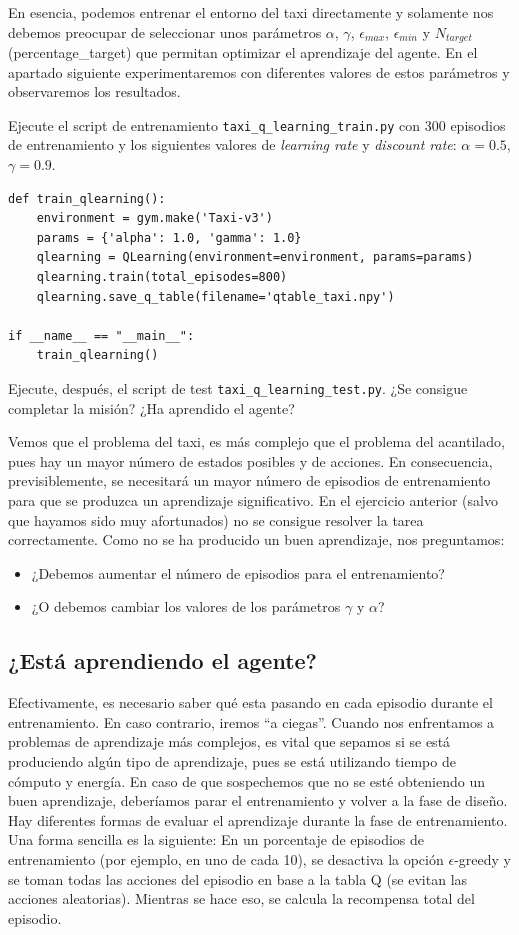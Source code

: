 \documentclass{article}
\begin{document}
En esencia, podemos entrenar el entorno del taxi directamente y solamente nos debemos preocupar de seleccionar unos parámetros $\alpha$, $\gamma$, $\epsilon_{max}$, $\epsilon_{min}$ y $N_{target}$ (percentage\_target) que permitan optimizar el aprendizaje del agente. En el apartado siguiente experimentaremos con diferentes valores de estos parámetros y observaremos los resultados.

\begin{exercise}
    Ejecute el script de entrenamiento \texttt{taxi\_q\_learning\_train.py} con 300 episodios de entrenamiento y los siguientes valores de \textit{learning rate} y \textit{discount rate}: $\alpha=0.5$, $\gamma=0.9$. 
\begin{verbatim}
def train_qlearning():
    environment = gym.make('Taxi-v3')
    params = {'alpha': 1.0, 'gamma': 1.0}
    qlearning = QLearning(environment=environment, params=params)
    qlearning.train(total_episodes=800)
    qlearning.save_q_table(filename='qtable_taxi.npy')
    
if __name__ == "__main__":
    train_qlearning()    
\end{verbatim}
Ejecute, después, el script de test \texttt{taxi\_q\_learning\_test.py}. ¿Se consigue completar la misión? ¿Ha aprendido el agente?
\end{exercise}

Vemos que el problema del taxi, es más complejo que el problema del acantilado, pues hay un mayor número de estados posibles y de acciones. En consecuencia, previsiblemente, se necesitará un mayor número de episodios de entrenamiento para que se produzca un aprendizaje significativo. En el ejercicio anterior (salvo que hayamos sido muy afortunados) no se consigue resolver la tarea correctamente. Como no se ha producido un buen aprendizaje, nos preguntamos:
\begin{itemize}
    \item ¿Debemos aumentar el número de episodios para el entrenamiento?
    \item ¿O debemos cambiar los valores de los parámetros $\gamma$ y $\alpha$?    
\end{itemize}

\subsection{¿Está aprendiendo el agente?}
 Efectivamente, es necesario saber qué esta pasando en cada episodio durante el entrenamiento. En caso contrario, iremos ``a ciegas''. Cuando nos enfrentamos a problemas de aprendizaje más complejos, es vital que sepamos si se está produciendo algún tipo de aprendizaje, pues se está utilizando tiempo de cómputo y energía. En caso de que sospechemos que no se esté obteniendo un buen aprendizaje, deberíamos parar el entrenamiento y volver a la fase de diseño. Hay diferentes formas de evaluar el aprendizaje durante la fase de entrenamiento. Una forma sencilla es la siguiente: En un porcentaje de episodios de entrenamiento (por ejemplo, en uno de cada 10), se desactiva la opción $\epsilon$-greedy y se toman todas las acciones del episodio en base a la tabla Q (se evitan las acciones aleatorias). Mientras se hace eso, se calcula la recompensa total del episodio.
 
\end{document}
